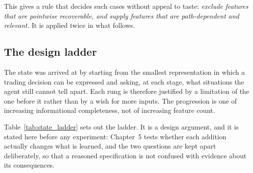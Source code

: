 This gives a rule that decides such cases without appeal to taste:
\emph{exclude features that are pointwise recoverable, and supply
features that are path-dependent and relevant.} It is applied twice in
what follows.

\subsection{The design ladder}
\label{sec:state_rationale}

The state was arrived at by starting from the smallest representation in
which a trading decision can be expressed and asking, at each stage, what
situations the agent still cannot tell apart. Each rung is therefore
justified by a limitation of the one before it rather than by a wish for
more inputs. The progression is one of increasing informational
completeness, not of increasing feature count.

Table~\ref{tab:state_ladder} sets out the ladder. It is a design
argument, and it is stated here before any experiment: Chapter~5 tests
whether each addition actually changes what is learned, and the two
questions are kept apart deliberately, so that a reasoned specification is
not confused with evidence about its consequences.

